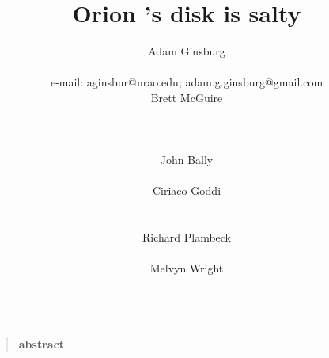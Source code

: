 \documentclass[12pt]{article}
\date{}
\author{
Adam Ginsburg\\
\nraojansky\\
e-mail: aginsbur@nrao.edu; adam.g.ginsburg@gmail.com\\
Brett McGuire\\
\hubble\\
\nraocv\\
\cfa\\
John Bally\\
\casa\\
Ciriaco Goddi\\
\allegro\\
\radboud\\
Richard Plambeck\\
\berkeley\\
Melvyn Wright\\
\berkeley\\
}
\title{Orion \sourcei's disk is salty}
\newenvironment{sciabstract}{%
\begin{quote} \bf  }
{\end{quote}}
\newcommand{\bam}[1]{\textcolor{green!65!black}{\textbf{[BAM: #1]}}}
\begin{document}


\maketitle

\begin{sciabstract}
    abstract
\end{sciabstract}



 
\end{document}
